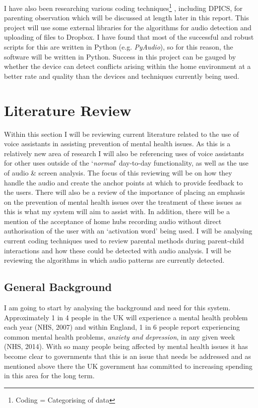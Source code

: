 \documentclass[a4paper,11pt]{report}
\begin{document}
 I have also been researching various coding techniques\footnote{Coding = Categorising of data} , including DPICS, for parenting observation which will be discussed at length later in this report. This project will use some external libraries for the algorithms for audio detection and uploading of files to Dropbox. I have found that most of the successful and robust scripts for this are written in Python (e.g. \textit{PyAudio}), so for this reason, the software will be written in Python. Success in this project can be gauged by whether the device can detect conflicts arising within the home environment at a better rate and quality than the devices and techniques currently being used.\\


\chapter{Literature Review}
Within this section I will be reviewing current literature related to the use of voice assistants in assisting prevention of mental health issues. As this is a relatively new area of research I will also be referencing uses of voice assistants for other uses outside of the ‘\textit{normal}’ day-to-day functionality, as well as the use of audio \& screen analysis. The focus of this reviewing will be on how they handle the audio and create the anchor points at which to provide feedback to the users. There will also be a review of the importance of placing an emphasis on the prevention of mental health issues over the treatment of these issues as this is what my system will aim to assist with. In addition, there will be a mention of the acceptance of home hubs recording audio without direct authorisation of the user with an ‘activation word’ being used. I will be analysing current coding techniques used to review parental methods during parent-child interactions and how these could be detected with audio analysis. I will be reviewing the algorithms in which audio patterns are currently detected. 

\section{General Background}
I am going to start by analysing the background and need for this system. Approximately 1 in 4 people in the UK will experience a mental health problem each year (NHS, 2007) and within England, 1 in 6 people report experiencing common mental health problems, \textit{anxiety and depression}, in any given week (NHS, 2014). With so many people being affected by mental health issues it has become clear to governments that this is an issue that needs be addressed and as mentioned above there the UK government has committed to increasing spending in this area for the long term. \\
\end{document}

